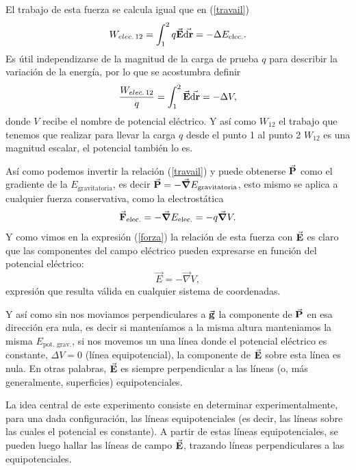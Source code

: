 \documentclass[laboratorio]{guia}
\begin{document}
El trabajo de esta fuerza se calcula igual que en (\ref{travail})
\begin{equation} 
  W_{elec.\,12}= \int_1^2 q \va{E} \va{\dd{r}}= - \Delta E_\text{elec.}.
  \label{travailElect}
\end{equation}
Es útil independizarse de la magnitud de la carga de prueba \(q\) para describir la variación de la energía, por lo que se acostumbra definir
\begin{equation} 
  \frac{W_{elec.\,12}}{q}= \int_1^2 \va{E} \va{\dd{r}}= - \Delta V,
  \label{travailElect}
\end{equation}
donde \(V\) recibe el nombre de potencial eléctrico.
Y así como $W_{12}$ el trabajo que tenemos que realizar para llevar la carga $q$ desde el punto 1 al punto 2 $W_{12}$ es una magnitud escalar, el potencial también lo es.

Así como podemos invertir la relación (\ref{travail}) y puede obtenerse \(\va{P}\) como el gradiente de la \(E_\text{gravitatoria}\), es decir \(\va{P}= - \grad E_\text{gravitatoria}\), esto mismo se aplica a cualquier fuerza conservativa, como la electrostática
\begin{equation} 
  \va{F}_\text{elec.}= - \grad E_\text{elec.} = - q \grad V.
\end{equation}
Y como vimos en la expresión (\ref{forza}) la relación de esta fuerza con \(\va{E}\) es claro que las componentes del campo eléctrico pueden expresarse en función del potencial eléctrico:
\begin{equation}
    \vec{E} = - \vec{\nabla} V,
\end{equation}
expresión que resulta válida en cualquier sistema de coordenadas. 

Y así como sin nos moviamos perpendiculares a \(\va{g}\) la componente de \(\va{P}\) en esa dirección era nula, es decir si manteníamos a la misma altura manteniamos la misma \(E_\text{pot. grav.}\), si nos movemos un una línea donde el potencial eléctrico es constante, $\Delta V=0$ (línea equipotencial), la componente de $\va{E}$ sobre esta línea es nula.
En otras palabras, $\va{E}$ es siempre perpendicular a las líneas (o, más generalmente, superficies) equipotenciales.

La idea central de este experimento consiste en determinar experimentalmente, para una dada configuración, las líneas equipotenciales (es decir, las líneas sobre las cuales el potencial es constante).
A partir de estas líneas equipotenciales, se pueden luego hallar las líneas de campo $\va{E}$, trazando líneas perpendiculares a las equipotenciales.
\end{document}
